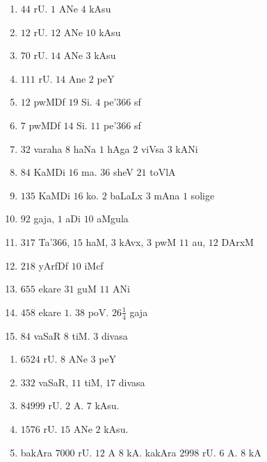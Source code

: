 \begin{multicols}{2}
\begin{enumerate}[$(1)$]
\item $44$ rU. $1$ ANe $4$ kAsu
\item $12$ rU. $12$ ANe $10$ kAsu
\item $70$ rU. $14$ ANe $3$ kAsu
\item $111$ rU. $14$ Ane $2$ peY
\item $12$ pwMDf $19$ Si. $4$ pe\char'366 sf
\item $7$ pwMDf $14$ Si. $11$ pe\char'366 sf
\item $32$ varaha $8$ haNa $1$ hAga $2$ viVsa $3$ kANi
\item $84$ KaMDi $16$ ma. $36$ sheV $21$ toVlA
\item $135$ KaMDi $16$ ko. $2$ baLaLx $3$ mAna $1$ solige
\item $92$ gaja, $1$ aDi $10$ aMgula
\item $317$ Ta\char'366, $15$ haM, $3$ kAvx, $3$ pwM $11$ au, $12$
DArxM
\item $218$ yArfDf $10$ iMcf
\item $655$ ekare $31$ guM $11$ ANi
\item $458$ ekare $1$. $38$ poV. $26 \frac{1}{4}$ gaja
\item $84$ vaSaR $8$ tiM. $3$ divasa
\end{enumerate}
\end{multicols}


\begin{enumerate}[$(1)$]
\item $6524$ rU. $8$ ANe $3$ peY
\item $332$ vaSaR, $11$ tiM, $17$ divasa
\item $84999$ rU. $2$ A. $7$ kAsu.
\item $1576$ rU. $15$ ANe $2$ kAsu.
\item bakAra $7000$ rU. $12$ A $8$ kA. kakAra $2998$ rU. $6$ A. $8$ kA
\end{enumerate}


